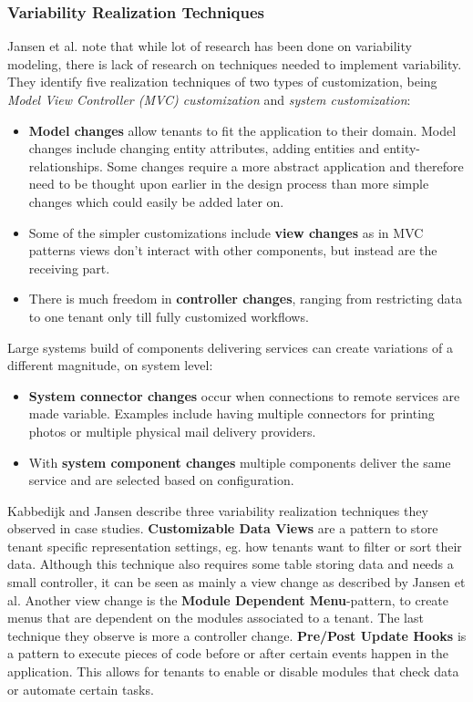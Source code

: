 \subsubsection{Variability Realization Techniques}
Jansen et al. \cite{jansen2010customization} note that while lot of research has been done on variability modeling, there is lack of research on techniques needed to implement variability. They identify five realization techniques of two types of customization, being \textit{Model View Controller (MVC) customization} and \textit{system customization}:
\begin{itemize}
\item \textbf{Model changes} allow tenants to fit the application to their domain. Model changes include changing entity attributes, adding entities and entity-relationships. Some changes require a more abstract application and therefore need to be thought upon earlier in the design process than more simple changes which could easily be added later on.
\item Some of the simpler customizations include \textbf{view changes} as in MVC patterns views don't interact with other components, but instead are the receiving part.
\item There is much freedom in \textbf{controller changes}, ranging from restricting data to one tenant only till fully customized workflows.
\end{itemize}
Large systems build of components delivering services can create variations of a different magnitude, on system level:
\begin{itemize}
\item \textbf{System connector changes} occur when connections to remote services are made variable. Examples include having multiple connectors for printing photos or multiple physical mail delivery providers.
\item With \textbf{system component changes} multiple components deliver the same service and are selected based on configuration.
\end{itemize}

Kabbedijk and Jansen \cite{kabbedijk2011variability} describe three variability realization techniques they observed in case studies. 
\textbf{Customizable Data Views} are a pattern to store tenant specific representation settings, eg. how tenants want to filter or sort their data. 
Although this technique also requires some table storing data and needs a small controller, it can be seen as mainly a view change as described by Jansen et al. 
Another view change is the \textbf{Module Dependent Menu}-pattern, to create menus that are dependent on the modules associated to a tenant. The last technique they observe is more a controller change. 
\textbf{Pre/Post Update Hooks} is a pattern to execute pieces of code before or after certain events happen in the application. 
This allows for tenants to enable or disable modules that check data or automate certain tasks.

